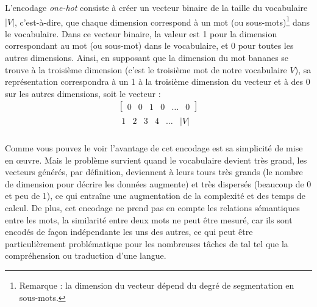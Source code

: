 \documentclass[12pt, twoside]{report}
\begin{document}
L'encodage \textit{one-hot} consiste à créer un vecteur binaire de la taille du vocabulaire $|V|$, c'est-à-dire, que chaque dimension correspond à un mot (ou sous-mots)\footnote{Remarque : la dimension du vecteur dépend du degré de segmentation en sous-mots.} dans le vocabulaire. Dans ce vecteur binaire, la valeur est 1 pour la dimension correspondant au mot (ou sous-mot) dans le vocabulaire, et 0 pour toutes les autres dimensions. Ainsi, en supposant que la dimension du mot \og bananes\fg{} se trouve à la troisième dimension (c'est le troisième mot de notre vocabulaire $V$), sa représentation correspondra à un 1 à la troisième dimension du vecteur et à des 0 sur les autres dimensions, soit le vecteur :
\begin{align*}
    \begin{bmatrix}
    0 & 0 & 1 & 0 & \dots & 0
    \end{bmatrix}\\
    \begin{matrix}
    1 & 2 & 3 & 4 & \dots & |V|
    \end{matrix}
\end{align*}
\hfill \autocite[Chap 7]{jurafsky}\\

Comme vous pouvez le voir l'avantage de cet encodage est sa simplicité de mise en \oe{}uvre. Mais le problème survient quand le vocabulaire devient très grand, les vecteurs générés, par définition, deviennent à leurs tours très grands (le nombre de dimension pour décrire les données augmente) et très dispersés (beaucoup de 0 et peu de 1), ce qui entraîne une augmentation de la complexité et des temps de calcul. De plus, cet encodage ne prend pas en compte les relations sémantiques entre les mots, la similarité entre deux mots ne peut être mesuré,  car ils sont encodés de façon indépendante les uns des autres, ce qui peut être particulièrement problématique pour les nombreuses tâches de \Gls{tal} tel que la compréhension ou traduction d'une langue.\\
\end{document}
